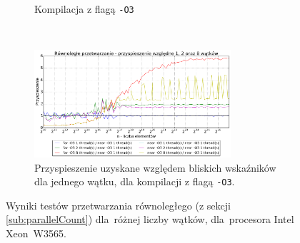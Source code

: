 \begin{figure}
\begin{subfigure}[c]{0.45\textwidth}
        \caption{Kompilacja z flagą \texttt{-O3}}
    \end{subfigure}
    \\
    \vspace{0.2cm}
    \begin{subfigure}[c]{1.0\textwidth}
        \centering
        \includegraphics[width=0.80\textwidth]{images/benchs_xeon/parallel_count_normalized}
        \caption{Przyspieszenie uzyskane względem bliskich wskaźników dla jednego wątku, dla kompilacji z flagą \texttt{-O3}.}
        \label{fig:parallelCount12RelativeXeon}
    \end{subfigure}
    \caption{Wyniki testów przetwarzania równoległego (z sekcji \ref{sub:parallelCount}) dla~różnej liczby wątków, dla~procesora Intel \mbox{Xeon W3565}.}
    \label{fig:parallelCount12Xeon}
\end{figure}

\clearpage

